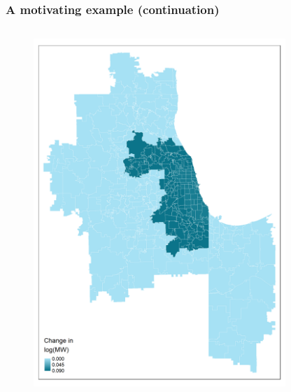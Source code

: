 \documentclass[aspectratio=169, t]{beamer}
\begin{document}
\begin{frame}[label = chi_example]
\frametitle{A motivating example (continuation)}
    \vspace{-6mm}
    \begin{columns}
        \begin{column}{0.50\textwidth}
            \vspace{-4mm}
            \begin{figure}
                \centering
                \includegraphics[scale = 0.36]{maps_events/output/chicago_2019-6_actual_mw.png}
            \end{figure}   
        \end{column}
        \begin{column}{0.50\textwidth}
            \vspace{-4mm}
            \begin{figure}
                \centering

\end{figure}
\end{column}
\end{columns}
\end{frame}
\end{document}
